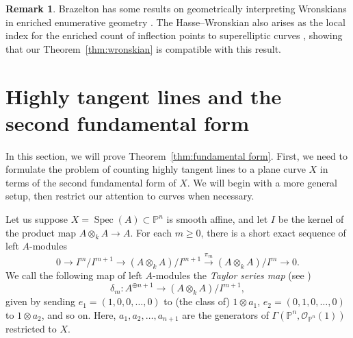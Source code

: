 \documentclass[12pt]{amsart}
\numberwithin{equation}{section}
\theoremstyle{plain}
\theoremstyle{definition}
\newtheorem{rem}[thm]{Remark}
\newcommand{\mc}[1]{\mathcal{#1}}
\newcommand{\Spec}{\operatorname{Spec}}
\begin{document}
\begin{rem}
    Brazelton has some results on geometrically interpreting Wronskians in enriched enumerative geometry \cite{Bra25}. The Hasse--Wronskian also arises as the local index for the enriched count of inflection points to superelliptic curves \cite{CDGLHS21}, showing that our Theorem~\ref{thm:wronskian} is compatible with this result.
\end{rem}

\section{Highly tangent lines and the second fundamental form}\label{sec:fundamental form}

In this section, we will prove Theorem~\ref{thm:fundamental form}. First, we need to formulate the problem of counting highly tangent lines to a plane curve $X$ in terms of the second fundamental form of $X$. We will begin with a more general setup, then restrict our attention to curves when necessary.

Let us suppose $X=\Spec(A)\subset \mathbb{P}^n$ is smooth affine, and let $I$ be the kernel of the product map $A\otimes_k A \rightarrow A$. For each $m\ge 0$, there is a short exact sequence of left $A$-modules
\begin{equation}
    0\longrightarrow I^m/I^{m+1}
    \longrightarrow (A\otimes_k A)/I^{m+1}
    \overset{\pi_m}{\longrightarrow}
     (A\otimes_k A)/I^{m}
    \longrightarrow 0.
\end{equation}
We call the following map of left $A$-modules the \emph{Taylor series map} (see \cite[Proposition~6.4.3]{MR1308020})
\begin{equation}\label{eq:taylor}
    \delta_m\colon A^{\oplus n+1} \longrightarrow (A\otimes_k A)/I^{m+1},
\end{equation}
given by sending $e_1=(1, 0, 0, \ldots, 0)$ to (the class of) $1\otimes a_1$, $e_2=(0, 1, 0, \ldots, 0)$ to $1\otimes a_2$, and so on. Here, $a_1, a_2,\ldots, a_{n+1}$ are the generators of $\Gamma(\mathbb{P}^n, \mc{O}_{\mathbb{P}^n}(1))$ restricted to $X$. 
\end{document}
